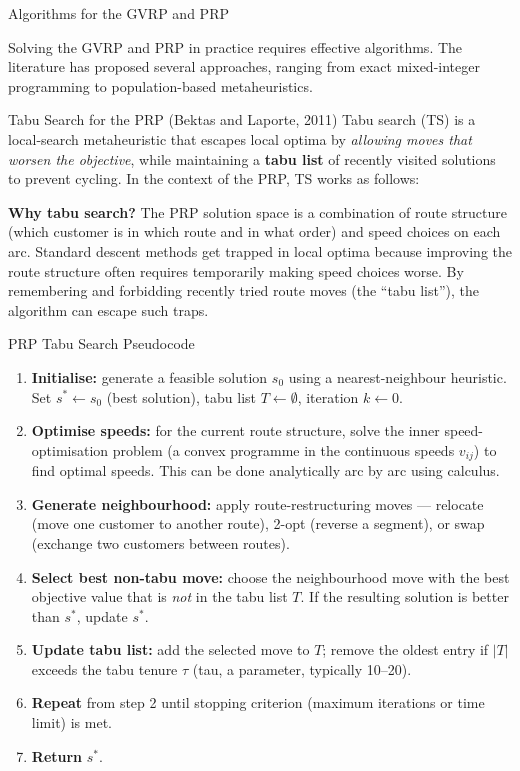 \documentclass[aspectratio=169,10pt]{beamer}
\begin{document}
\begin{frame}[allowframebreaks]{Algorithms for the GVRP and PRP}

  Solving the GVRP and PRP in practice requires effective algorithms.
  The literature has proposed several approaches, ranging from exact
  mixed-integer programming to population-based metaheuristics.

  \begin{block}{Tabu Search for the PRP (Bektas and Laporte, 2011)}
    Tabu search (TS) is a local-search metaheuristic that escapes local optima
    by \emph{allowing moves that worsen the objective}, while maintaining a
    \textbf{tabu list} of recently visited solutions to prevent cycling.
    In the context of the PRP, TS works as follows:

    \medskip
    \textbf{Why tabu search?}  The PRP solution space is a combination of
    route structure (which customer is in which route and in what order) and
    speed choices on each arc.  Standard descent methods get trapped in
    local optima because improving the route structure often requires temporarily
    making speed choices worse.  By remembering and forbidding recently tried
    route moves (the ``tabu list''), the algorithm can escape such traps.
  \end{block}

  \framebreak

  \begin{block}{PRP Tabu Search Pseudocode}
    \begin{enumerate}
      \item \textbf{Initialise:} generate a feasible solution $s_0$ using
      a nearest-neighbour heuristic.  Set $s^* \leftarrow s_0$ (best solution),
      tabu list $T \leftarrow \emptyset$, iteration $k \leftarrow 0$.
      \item \textbf{Optimise speeds:} for the current route structure, solve the
      inner speed-optimisation problem (a convex programme in the continuous
      speeds $v_{ij}$) to find optimal speeds.  This can be done analytically
      arc by arc using calculus.
      \item \textbf{Generate neighbourhood:} apply route-restructuring moves
      --- relocate (move one customer to another route), 2-opt (reverse a
      segment), or swap (exchange two customers between routes).
      \item \textbf{Select best non-tabu move:} choose the neighbourhood move
      with the best objective value that is \emph{not} in the tabu list $T$.
      If the resulting solution is better than $s^*$, update $s^*$.
      \item \textbf{Update tabu list:} add the selected move to $T$; remove the
      oldest entry if $|T|$ exceeds the tabu tenure $\tau$ (tau, a parameter,
      typically 10--20).
      \item \textbf{Repeat} from step 2 until stopping criterion (maximum
      iterations or time limit) is met.
      \item \textbf{Return} $s^*$.
    \end{enumerate}
  \end{block}


\end{frame}
\end{document}
